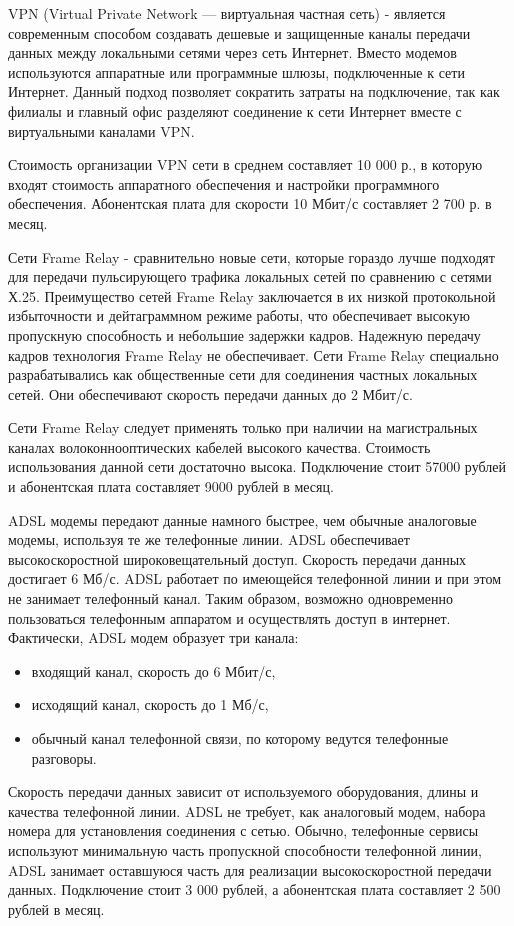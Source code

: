 \documentclass[russian,utf8,emptystyle]{eskdtext}
\begin{document}
VPN (Virtual Private Network — виртуальная частная сеть) - является современным способом создавать дешевые и защищенные каналы передачи данных между локальными сетями через сеть Интернет. Вместо модемов используются аппаратные или программные шлюзы, подключенные к сети Интернет. Данный подход позволяет сократить затраты на подключение, так как филиалы и главный офис разделяют соединение к сети Интернет вместе с виртуальными каналами VPN.

Стоимость организации VPN сети в среднем составляет 10 000 р., в которую входят стоимость аппаратного обеспечения и настройки программного обеспечения. Абонентская плата для скорости 10 Мбит/с составляет 2 700 р. в месяц.

Сети Frame Relay - сравнительно новые сети, которые гораздо лучше подходят для передачи пульсирующего трафика локальных сетей по сравнению с сетями Х.25. Преимущество сетей Frame Relay заключается в их низкой протокольной избыточности и дейтаграммном режиме работы, что обеспечивает высокую пропускную способность и небольшие задержки кадров. Надежную передачу кадров технология Frame Relay не обеспечивает. Сети Frame Relay специально разрабатывались как общественные сети для соединения частных локальных сетей. Они обеспечивают скорость передачи данных до 2 Мбит/с.

Сети Frame Relay следует применять только при наличии на магистральных каналах волоконнооптических кабелей высокого качества. Стоимость использования данной сети достаточно высока. Подключение стоит 57000 рублей и абонентская плата составляет 9000 рублей в месяц.

ADSL модемы передают данные намного быстрее, чем обычные аналоговые модемы, используя те же телефонные линии. ADSL обеспечивает высокоскоростной широковещательный доступ. Скорость передачи данных достигает 6 Мб/с. ADSL работает по имеющейся телефонной
линии и при этом не занимает телефонный канал. Таким образом, возможно одновременно пользоваться телефонным аппаратом и осуществлять доступ в интернет. Фактически, ADSL модем образует три канала:
\begin{itemize}[label=-]
\item входящий канал, скорость до 6 Мбит/с,
\item исходящий канал, скорость до 1 Мб/с,
\item обычный канал телефонной связи, по которому ведутся телефонные разговоры.
\end{itemize}

Скорость передачи данных зависит от используемого оборудования, длины и качества телефонной линии. ADSL не требует, как аналоговый модем, набора номера для установления соединения с сетью. Обычно, телефонные сервисы используют минимальную часть пропускной способности телефонной линии, ADSL занимает оставшуюся часть для реализации высокоскоростной передачи данных. Подключение стоит 3 000 рублей, а абонентская плата составляет 2 500 рублей в месяц.
\end{document}
